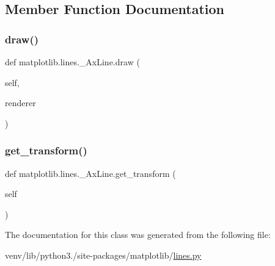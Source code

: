 \subsection{Member Function Documentation}
\mbox{\label{classmatplotlib_1_1lines_1_1__AxLine_a69274cb971a92ec98e47d36d361f47a8}} 
\subsubsection{\texorpdfstring{draw()}{draw()}}
{\footnotesize\ttfamily def matplotlib.\+lines.\+\_\+\+Ax\+Line.\+draw (\begin{DoxyParamCaption}\item[{}]{self,  }\item[{}]{renderer }\end{DoxyParamCaption})}

\mbox{\label{classmatplotlib_1_1lines_1_1__AxLine_a189ebe6ec0486614627a24c8f845699f}} 
\subsubsection{\texorpdfstring{get\+\_\+transform()}{get\_transform()}}
{\footnotesize\ttfamily def matplotlib.\+lines.\+\_\+\+Ax\+Line.\+get\+\_\+transform (\begin{DoxyParamCaption}\item[{}]{self }\end{DoxyParamCaption})}



The documentation for this class was generated from the following file\+:\begin{DoxyCompactItemize}
\item 
venv/lib/python3./site-\/packages/matplotlib/\hyperlink{lines_8py}{lines.\+py}\end{DoxyCompactItemize}
